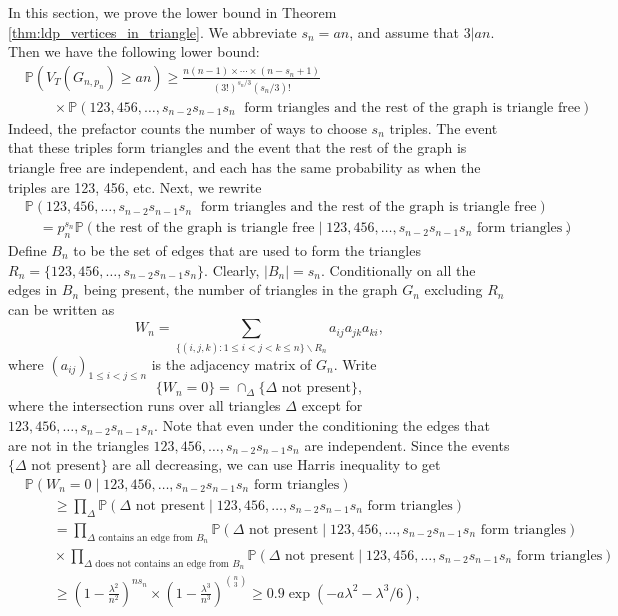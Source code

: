 \documentclass[bj,authoryear,noshowframe]{imsart}
\numberwithin{equation}{section}
\theoremstyle{plain}
\theoremstyle{definition}
\renewcommand{\setminus}{\backslash}
\newcommand{\eqn}[1]{\begin{equation}#1\end{equation}}
\newcommand{\eqan}[1]{\begin{align}#1\end{align}}
\newcommand{\nn}{\nonumber}
\begin{document}
In this section, we prove the lower bound in Theorem \ref{thm:ldp_vertices_in_triangle}.  We abbreviate $s_n=an$, and assume that $3|an$. Then we have the following lower bound:
	\begin{equation}
	\label{eqn:244pm02may22}
	\begin{aligned}
	&\mathbb{P}(V_{ T}(G_{n,p_n}) \geq an) \geq \frac{n(n-1) \times\cdots\times (n-s_n+1)}{(3!)^{s_n/3}(s_n/3)!} \\
	&\qquad\times\mathbb{P}(123, 456, \ldots, s_{n-2}s_{n-1}s_n\;\text{ form triangles and the rest 
	of the graph is triangle free}).
	\end{aligned}
	\end{equation}
Indeed, the prefactor counts the number of ways to choose $s_n$ triples. The event that these triples form triangles and the event that the rest of the graph is triangle free are independent, and each has the same probability as when the triples are 123, 456, etc. Next, we rewrite	
	\eqan{
	&\mathbb{P}(123, 456,\ldots, s_{n-2}s_{n-1}s_n\;\text{ form triangles and the rest of the graph is triangle free})\\
	&\quad =p_n^{s_n} \mathbb{P}(\text{the rest of the graph is triangle free}\mid 123, 456,\ldots, s_{n-2}s_{n-1}s_n\text{ form triangles}).   \nn
	}
Define $B_n$ to be the set of edges that are used to form the triangles $R_n=\{123, 456,\ldots, s_{n-2}s_{n-1}s_n\}$. Clearly, $|B_n|=s_n$. Conditionally on all the edges in $B_n$ being present, the number of triangles in the graph $G_n$ excluding $R_n$ can be written as
	\begin{equation}
	\label{eqn:308pm02may22}
	W_n = \sum_{\{(i,j,k)\colon 1\leq i<j<k \leq n\}\setminus R_n} a_{ij}a_{jk}a_{ki},
	\end{equation}
where $(a_{ij})_{1 \leq i < j \leq n}$ is the adjacency matrix of $G_n$. Write
	\eqn{
	\{W_n=0\}=\cap_{\Delta} \{\Delta \text{ not present}\},
	}
where the intersection runs over all triangles $\Delta$ except for $123,456,\ldots, s_{n-2}s_{n-1}s_n$. Note that even under the conditioning the edges that are not in the triangles $123,456,\ldots, s_{n-2}s_{n-1}s_n$ are independent. Since the events $\{\Delta \text{ not present}\}$ are all decreasing, we can use Harris inequality \cite{Harr60} to get  
	\begin{align}
	&\mathbb{P}(W_n=0\mid 123, 456,\ldots, s_{n-2}s_{n-1}s_n\text{ form triangles})\\
	&\qquad\geq \prod_{\Delta} \mathbb{P}(\Delta \text{ not present}\mid 123, 456,\ldots, s_{n-2}s_{n-1}s_n\text{ form triangles})\\
	&\qquad= \prod_{\Delta \text{ contains an edge from }B_n } \mathbb{P}(\Delta \text{ not present}\mid 123, 456,\ldots, s_{n-2}s_{n-1}s_n\text{ form triangles}) \\
	&\qquad \times \prod_{\Delta \text{ does not contains an edge from }B_n } \mathbb{P}(\Delta \text{ not present}\mid 123, 456,\ldots, s_{n-2}s_{n-1}s_n\text{ form triangles}) \\
	&\qquad  \geq \left(1-\frac{\lambda^2}{n^2}\right)^{ns_n} \times  \left(1-\frac{\lambda^3}{n^3}\right)^{{n \choose 3}} \geq 0.9 \exp\left(-a\lambda^2-\lambda^3/6\right),
	\end{align}
\end{document}
